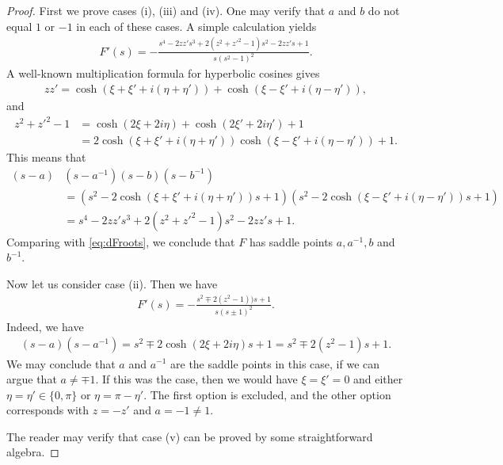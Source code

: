 \documentclass[%
 jmp,
cp,  %
 amsmath,amsthm,amssymb,%
 reprint,%
onecolumn]{revtex4-2}
\begin{document}
\begin{proof}
First we prove cases (i), (iii) and (iv). One may verify that $a$ and $b$ do not equal $1$ or $-1$ in each of these cases. 
A simple calculation yields
\begin{align} \label{eq:dFroots}
F'(s) = -\frac{s^4 - 2 z z' s^3 + 2(z^2+z'^2-1) s^2 - 2 z z' s+1}{s (s^2-1)^2}. 
\end{align}
A well-known multiplication formula for hyperbolic cosines gives
\begin{align}
z z' = \cosh(\xi+\xi'+i(\eta+\eta'))+\cosh(\xi-\xi'+i(\eta-\eta')),
\end{align}
and
\begin{align}
z^2+z'^2-1
&= \cosh(2\xi+2i\eta) + \cosh(2\xi'+2i\eta')+1\\
&= 2 \cosh(\xi+\xi'+i(\eta+\eta')) \cosh(\xi-\xi'+i(\eta-\eta'))+1.
\end{align}
This means that
\begin{align} \nonumber
(s-a)&(s-a^{-1})(s-b)(s-b^{-1})\\ \nonumber
&= (s^2-2 \cosh(\xi+\xi'+i(\eta+\eta')) s +1) (s^2-2 \cosh(\xi-\xi'+i(\eta-\eta')) s +1)\\ \label{eq:saddlePolynomial}
&= s^4 - 2 z z' s^3 + 2(z^2+z'^2-1) s^2 - 2 z z' s+1.
\end{align}
Comparing with \eqref{eq:dFroots}, we conclude that $F$ has saddle points $a, a^{-1}, b$ and $b^{-1}$. 

Now let us consider case (ii). Then we have
\begin{align}
F'(s) = -\frac{s^2\mp 2(z^2- 1))s+1}{s(s\pm 1)^2}.
\end{align}
Indeed, we have
\begin{align}
(s-a)(s-a^{-1})
= s^2\mp 2 \cosh(2\xi+2i \eta) s +1
= s^2\mp 2(z^2-1) s +1.
\end{align}
We may conclude that $a$ and $a^{-1}$ are the saddle points in this case, if we can argue that $a \neq \mp 1$. If this was the case, then we would have $\xi=\xi'=0$ and either $\eta=\eta'\in\{0,\pi\}$ or $\eta=\pi-\eta'$. The first option is excluded, and the other option corresponds with $z=-z'$ and $a=-1 \neq 1$. 

The reader may verify that case (v) can be proved by some straightforward algebra. 
\end{proof}

\end{document}
